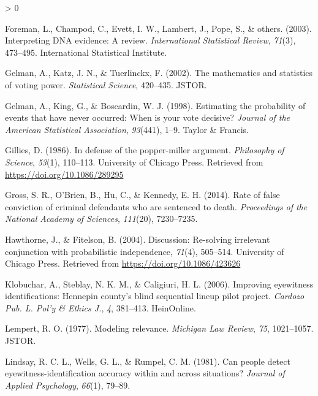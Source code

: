 \documentclass[
  10pt,
  dvipsnames,enabledeprecatedfontcommands]{scrartcl}
\newlength{\cslhangindent}
\newenvironment{CSLReferences}[2] %
 {%
  \setlength{\parindent}{0pt}
  \ifodd #1 \everypar{\setlength{\hangindent}{\cslhangindent}}\ignorespaces\fi
  \ifnum #2 > 0
  \setlength{\parskip}{#2\baselineskip}
  \fi
 }%
 {}
\begin{document}
\begin{CSLReferences}{1}{0}
\leavevmode\hypertarget{ref-foreman2003interpreting}{}%
Foreman, L., Champod, C., Evett, I. W., Lambert, J., Pope, S., \&
others. (2003). Interpreting DNA evidence: A review. \emph{International
Statistical Review}, \emph{71}(3), 473--495. International Statistical
Institute.

\leavevmode\hypertarget{ref-gelman2002mathematics}{}%
Gelman, A., Katz, J. N., \& Tuerlinckx, F. (2002). The mathematics and
statistics of voting power. \emph{Statistical Science}, 420--435. JSTOR.

\leavevmode\hypertarget{ref-gelman1998estimating}{}%
Gelman, A., King, G., \& Boscardin, W. J. (1998). Estimating the
probability of events that have never occurred: When is your vote
decisive? \emph{Journal of the American Statistical Association},
\emph{93}(441), 1--9. Taylor \& Francis.

\leavevmode\hypertarget{ref-Gillies1986defense}{}%
Gillies, D. (1986). In defense of the popper-miller argument.
\emph{Philosophy of Science}, \emph{53}(1), 110--113. University of
Chicago Press. Retrieved from \url{https://doi.org/10.1086/289295}

\leavevmode\hypertarget{ref-gross2014RateFalseConviction}{}%
Gross, S. R., O'Brien, B., Hu, C., \& Kennedy, E. H. (2014). Rate of
false conviction of criminal defendants who are sentenced to death.
\emph{Proceedings of the National Academy of Sciences}, \emph{111}(20),
7230--7235.

\leavevmode\hypertarget{ref-HawthorneFitelson2004re-solving}{}%
Hawthorne, J., \& Fitelson, B. (2004). Discussion: Re-solving irrelevant
conjunction with probabilistic independence, \emph{71}(4), 505--514.
University of Chicago Press. Retrieved from
\url{https://doi.org/10.1086/423626}

\leavevmode\hypertarget{ref-klobuchar2006improving}{}%
Klobuchar, A., Steblay, N. K. M., \& Caligiuri, H. L. (2006). Improving
eyewitness identifications: Hennepin county's blind sequential lineup
pilot project. \emph{Cardozo Pub. L. Pol'y \& Ethics J.}, \emph{4},
381--413. HeinOnline.

\leavevmode\hypertarget{ref-lempert1977modeling}{}%
Lempert, R. O. (1977). Modeling relevance. \emph{Michigan Law Review},
\emph{75}, 1021--1057. JSTOR.

\leavevmode\hypertarget{ref-Lindsay1981CanPeopleDetect}{}%
Lindsay, R. C. L., Wells, G. L., \& Rumpel, C. M. (1981). Can people
detect eyewitness-identification accuracy within and across situations?
\emph{Journal of Applied Psychology}, \emph{66}(1), 79--89.


\end{CSLReferences}
\end{document}
